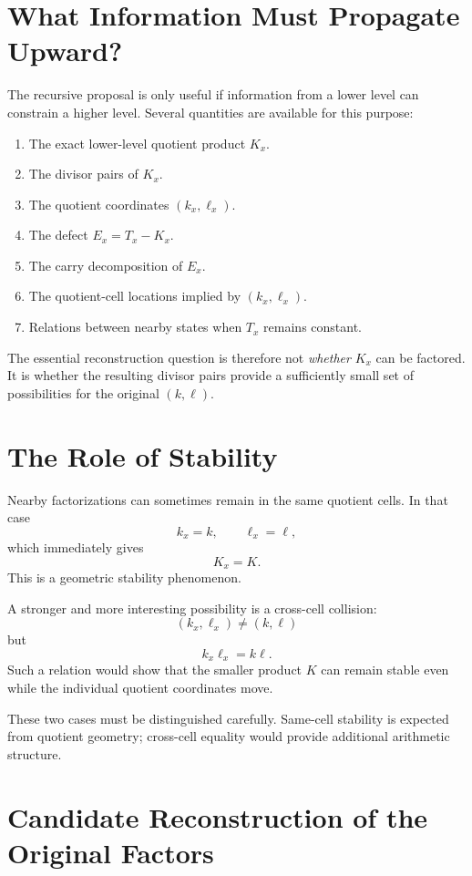 \documentclass[11pt,a4paper]{article}
\begin{document}
\section{What Information Must Propagate Upward?}

The recursive proposal is only useful if information from a lower level
can constrain a higher level. Several quantities are available for this
purpose:

\begin{enumerate}[label=(\arabic*)]
    \item The exact lower-level quotient product $K_x$.
    \item The divisor pairs of $K_x$.
    \item The quotient coordinates $(k_x,\ell_x)$.
    \item The defect $E_x=T_x-K_x$.
    \item The carry decomposition of $E_x$.
    \item The quotient-cell locations implied by $(k_x,\ell_x)$.
    \item Relations between nearby states when $T_x$ remains constant.
\end{enumerate}

The essential reconstruction question is therefore not
\emph{whether} $K_x$ can be factored. It is whether the resulting divisor
pairs provide a sufficiently small set of possibilities for the original
$(k,\ell)$.

\section{The Role of Stability}

Nearby factorizations can sometimes remain in the same quotient cells. In
that case
\[
    k_x=k,
    \qquad
    \ell_x=\ell,
\]
which immediately gives
\[
    K_x=K.
\]
This is a geometric stability phenomenon.

A stronger and more interesting possibility is a cross-cell collision:
\[
    (k_x,\ell_x)\ne(k,\ell)
\]
but
\[
    k_x\ell_x=k\ell.
\]
Such a relation would show that the smaller product $K$ can remain stable
even while the individual quotient coordinates move.

These two cases must be distinguished carefully. Same-cell stability is
expected from quotient geometry; cross-cell equality would provide
additional arithmetic structure.

\section{Candidate Reconstruction of the Original Factors}
\end{document}
